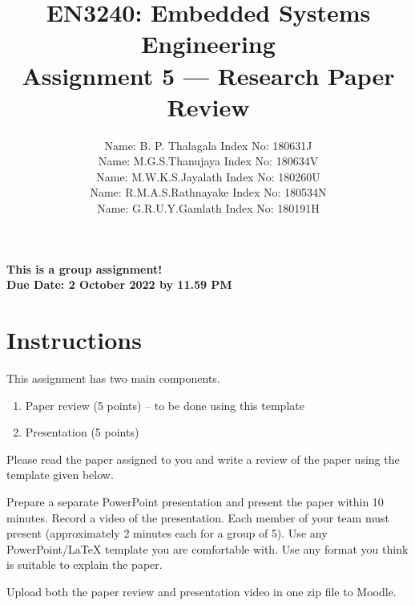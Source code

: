 \documentclass[11pt,letterpaper]{article}
\begin{document}
	
	\title{EN3240: Embedded Systems Engineering \\Assignment 5 --- Research Paper Review}
	
	\author{
		Name: B. P. Thalagala	 \qquad Index No:	180631J\\
		Name: M.G.S.Thanujaya	 \qquad Index No:	180634V\\
		Name: M.W.K.S.Jayalath \qquad Index No:		180260U\\
		Name: R.M.A.S.Rathnayake \qquad Index No:	180534N\\
		Name: G.R.U.Y.Gamlath	 \qquad Index No:	180191H\\
	}
	
	\maketitle
	
	\begin{center}
		\color{red}\bf This is a group assignment! \\ Due Date: 2 October 2022 by 11.59 PM
	\end{center}
	
	\section*{Instructions}
	
	This assignment has two main components.
	
	\begin{enumerate}[noitemsep]
		\item Paper review (5 points) -- to be done using this template
		\item Presentation (5 points)
	\end{enumerate}
	
	Please read the paper assigned to you and write a review of the paper using the template given below.
	
	Prepare a separate PowerPoint presentation and present the paper within 10 minutes. Record a video of the presentation. Each member of your team must present (approximately 2 minutes each for a group of 5). Use any PowerPoint/LaTeX template you are comfortable with. Use any format you think is suitable to explain the paper.
	
	Upload both the paper review and presentation video in one zip file to Moodle.
	
	\newpage
	
\end{document}
